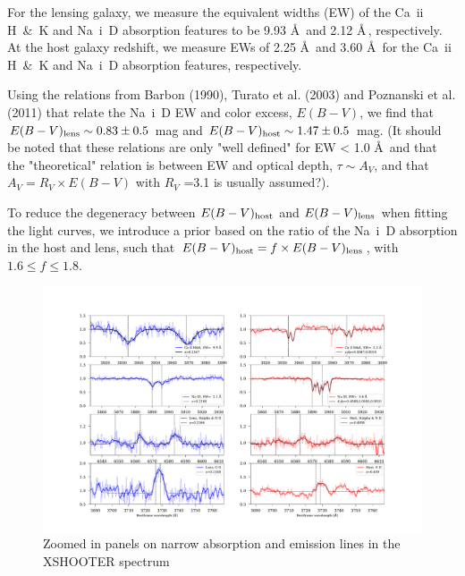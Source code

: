 \documentclass[a4paper,fleqn,usenatbib]{mnras}
\begin{document}
For the lensing galaxy, we measure the equivalent widths (EW) of the Ca~{\sc ii} H~\&~K and Na~{\sc i}~D absorption features to be 9.93 \AA \, and 2.12 \AA \,, respectively. At the host galaxy redshift, we measure EWs of 2.25 \AA \, and 3.60 \AA \, for the Ca~{\sc ii} H~\&~K and Na~{\sc i}~D absorption features, respectively.

Using the relations from Barbon (1990), Turato et al. (2003) and Poznanski et al. (2011) that relate the Na~{\sc i}~D EW and color excess, $E(B-V)$, we find that $E(B-V)_{\rm lens} \sim 0.83 \pm 0.5$ mag and $E(B-V)_{\rm host} \sim 1.47 \pm 0.5$ mag. (It should be noted that these relations are only "well defined" for EW < 1.0 \AA \, and that the "theoretical" relation is between EW and optical depth, $\tau \sim A_V$, and that $A_V = R_V \times E(B-V)$ with $R_V$ =3.1 is usually assumed?). 

To reduce the degeneracy between $E(B-V)_{\rm host}$ and $E(B-V)_{\rm lens}$ when fitting the light curves, we introduce a prior based on the ratio of the Na~{\sc i}~D absorption in the host and lens, such that $E(B-V)_{\rm host} = f \times E(B-V)_{\rm lens}$, with $1.6 \leq f \leq 1.8$.


\begin{figure}
	\centering
	\caption{Zoomed in panels on narrow absorption and emission lines in the XSHOOTER spectrum
	\label{fig:spec_panels}}
	\includegraphics[width=\textwidth]{spec_panels.pdf}
\end{figure}
\end{document}
